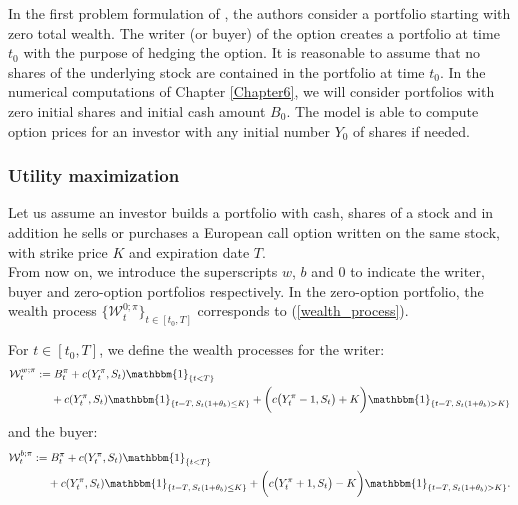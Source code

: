 \begin{Remark}
In the first problem formulation of \cite{HoNe89}, the authors 
consider a portfolio starting with zero total wealth. 
The writer (or buyer) of the option creates a portfolio at time $t_0$ with the purpose of hedging the option.
It is reasonable to assume that no shares of the underlying stock are contained in the portfolio at time $t_0$. 
In the numerical computations of Chapter \ref{Chapter6}, we will consider portfolios with zero initial shares and initial cash amount $B_0$. 
The model is able to compute option prices for an investor with any initial number $Y_0$ of shares if needed.
\end{Remark}



\subsubsection{Utility maximization}


Let us assume an investor builds a portfolio with cash, shares of a stock and in addition he sells or purchases a 
European call option written on the same stock, with strike price $K$ and expiration date $T$.\\
From now on, we introduce the superscripts $w$, $b$ and $0$ to indicate the writer, buyer and zero-option portfolios respectively.
In the zero-option portfolio, the wealth process $\{\mathcal{W}^{0; \pi}_t\}_{t \in [t_0,T]}$ corresponds to (\ref{wealth_process}).
\begin{Definition}
For $t \in [t_0,T]$, we define the wealth processes for the writer:
  \begin{align}\label{wealth_writer}
   \mathcal{W}^{w; \pi}_t := & \; B^{\pi}_t + c(Y^{\pi}_t,S_t) \mathbbm{1}_{\{t < T\}} \\ \nonumber
   & + c(Y^{\pi}_t,S_t) \mathbbm{1}_{\{t = T,\, S_t(1+ \theta_b ) \leq K\}}
   + \biggl( c\bigl( Y^{\pi}_t-1,S_t \bigr) + K \biggr) \mathbbm{1}_{\{t=T,\, S_t(1+ \theta_b ) > K \}}
  \end{align}
 and the buyer:
  \begin{align}\label{wealth_buyer}
   \mathcal{W}^{b; \pi}_t := & \; B^{\pi}_t + c(Y^{\pi}_t,S_t) \mathbbm{1}_{\{t < T\}} \\ \nonumber
   & + c(Y^{\pi}_t,S_t) \mathbbm{1}_{\{t = T,\, S_t(1+ \theta_b ) \leq K\}}
   + \biggl( c\bigl( Y^{\pi}_t+1,S_t \bigr) - K \biggr) \mathbbm{1}_{\{t=T,\, S_t(1+ \theta_b ) > K \}}.
  \end{align}
\end{Definition}

